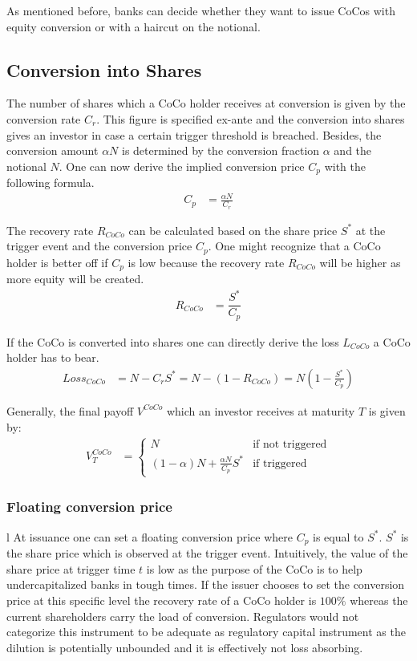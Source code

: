 As mentioned before, banks can decide whether they want to issue CoCos with equity conversion or with a haircut on the notional. 

\subsection{Conversion into Shares}
The number of shares which a CoCo holder receives at conversion is given by the conversion rate $C_r$. This figure is specified ex-ante and the conversion into shares gives an investor in case a certain trigger threshold is breached. Besides, the conversion amount $\alpha N$ is determined by the conversion fraction $\alpha$ and the notional $N$. One can now derive the implied conversion price $C_p$ with the following formula. \citep{de2014handbook}
\begin{align}
C_p &= \frac{\alpha N}{C_r}
\end{align}

The recovery rate $R_{CoCo}$ can be calculated based on the share price $S^*$ at the trigger event and the conversion price $C_p$. One might recognize that a CoCo holder is better off if $C_p$ is low because the recovery rate $R_{CoCo}$  will be higher as more equity will be created. 
\begin{align} \label{recoveryrate}
R_{CoCo} &= \dfrac{S^*}{C_p}
\end{align}

If the CoCo is converted into shares one can directly derive the loss $L_{CoCo}$ a CoCo holder has to bear.
\begin{align}
{Loss}_{CoCo} &= N - C_r S^* = N - (1 - R_{CoCo}) = N \left(1 - \frac{S^{*}}{C_p} \right)
\end{align}

Generally, the final payoff $V^{CoCo}$ which an investor receives at maturity $T$ is given by:
\begin{align}\label{valueatmaturity}
    V^{CoCo}_T &= \begin{cases} N & \text{if not triggered} \\ (1 - \alpha) N + \frac{\alpha N}{C_p} S^{*} & \text{if triggered} \end{cases}
\end{align}

\subsubsection*{Floating conversion price}l
At issuance one can set a floating conversion price where $C_p$ is equal to $S^*$. $S^*$ is the share price which is observed at the trigger event. Intuitively, the value of the share price at trigger time $t$ is low as the purpose of the CoCo is to help undercapitalized banks in tough times. If the issuer chooses to set the conversion price at this specific level the recovery rate of a CoCo holder is $100\%$ whereas the current shareholders carry the load of conversion. Regulators would not categorize this instrument to be adequate as regulatory capital instrument as the dilution is potentially unbounded and it is effectively not loss absorbing. \citep{de2014handbook}

